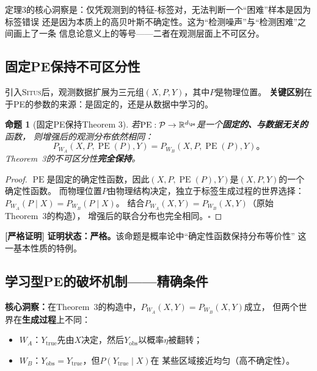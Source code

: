 \documentclass[11pt,a4paper]{article}
\newtheorem{proposition}[theorem]{命题}
\theoremstyle{remark}
\DeclareMathOperator{\PE}{PE}
\newcommand{\R}{\mathbb{R}}
\newcommand{\Ppos}{\mathcal{P}}
\newcommand{\Situs}{\textsc{Situs}}
\newcommand{\rigorous}{\textnormal{\textbf{[严格证明]}}}
\begin{document}
定理3的核心洞察是：仅凭观测到的特征-标签对，无法判断一个``困难''样本是因为标签错误
还是因为本质上的高贝叶斯不确定性。这为``检测噪声''与``检测困难''之间画上了一条
信息论意义上的等号——二者在观测层面上不可区分。

\subsection{固定PE保持不可区分性}

引入\Situs{}后，观测数据扩展为三元组$(X, P, Y)$，其中$P$是物理位置。
\textbf{关键区别}在于PE的参数的来源：是固定的，还是从数据中学习的。

\begin{proposition}[固定PE保持Theorem 3]
\label{prop:4.1}
若$\PE: \Ppos \to \R^{d_{\pe}}$是一个\textbf{固定的、与数据无关的}函数，
则增强后的观测分布依然相同：
\begin{equation}
    P_{W_A}(X, P, \PE(P), Y) = P_{W_B}(X, P, \PE(P), Y)。
\end{equation}
Theorem~3的不可区分性\textbf{完全保持}。
\end{proposition}

\begin{proof}
$\PE$是固定的确定性函数，因此$(X, P, \PE(P), Y)$是$(X, P, Y)$的一个确定性函数。
而物理位置$P$由物理结构决定，独立于标签生成过程的世界选择：
$P_{W_A}(P \mid X) = P_{W_B}(P \mid X)$。
结合$P_{W_A}(X, Y) = P_{W_B}(X, Y)$（原始Theorem~3的构造），
增强后的联合分布也完全相同。\hfill $\square$
\end{proof}

\rigorous{} \textbf{证明状态：严格。}该命题是概率论中``确定性函数保持分布等价性''
这一基本性质的特例。

\subsection{学习型PE的破坏机制——精确条件}

\textbf{核心洞察：}在Theorem~3的构造中，$P_{W_A}(X, Y) = P_{W_B}(X, Y)$成立，
但两个世界在\textbf{生成过程}上不同：
\begin{itemize}
    \item $W_A$：$Y_{\text{true}}$先由$X$决定，然后$Y_{\text{obs}}$以概率$\eta$被翻转；
    \item $W_B$：$Y_{\text{obs}} = Y_{\text{true}}$，但$P(Y_{\text{true}} \mid X)$在
          某些区域接近均匀（高不确定性）。
\end{itemize}
\end{document}
